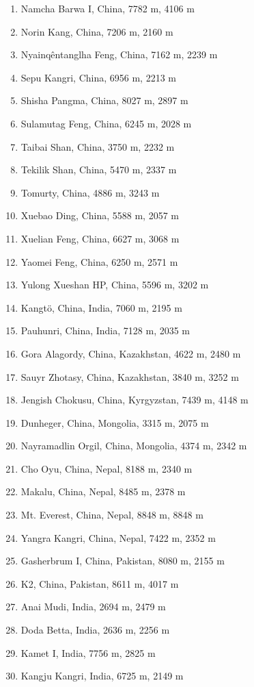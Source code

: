 \documentclass[10pt,twocolumn,letterpaper]{article}
\begin{document}
\begin{flushleft}
\begin{enumerate}
    \item Namcha Barwa I, China, 7782 m, 4106 m
    \item Norin Kang, China, 7206 m, 2160 m
    \item Nyainqêntanglha Feng, China, 7162 m, 2239 m
    \item Sepu Kangri, China, 6956 m, 2213 m
    \item Shisha Pangma, China, 8027 m, 2897 m
    \item Sulamutag Feng, China, 6245 m, 2028 m
    \item Taibai Shan, China, 3750 m, 2232 m
    \item Tekilik Shan, China, 5470 m, 2337 m
    \item Tomurty, China, 4886 m, 3243 m
    \item Xuebao Ding, China, 5588 m, 2057 m
    \item Xuelian Feng, China, 6627 m, 3068 m
    \item Yaomei Feng, China, 6250 m, 2571 m
    \item Yulong Xueshan HP, China, 5596 m, 3202 m
    \item Kangtö, China, India, 7060 m, 2195 m
    \item Pauhunri, China, India, 7128 m, 2035 m
    \item Gora Alagordy, China, Kazakhstan, 4622 m, 2480 m
    \item Sauyr Zhotasy, China, Kazakhstan, 3840 m, 3252 m
    \item Jengish Chokusu, China, Kyrgyzstan, 7439 m, 4148 m
    \item Dunheger, China, Mongolia, 3315 m, 2075 m
    \item Nayramadlin Orgil, China, Mongolia, 4374 m, 2342 m
    \item Cho Oyu, China, Nepal, 8188 m, 2340 m
    \item Makalu, China, Nepal, 8485 m, 2378 m
    \item Mt. Everest, China, Nepal, 8848 m, 8848 m
    \item Yangra Kangri, China, Nepal, 7422 m, 2352 m
    \item Gasherbrum I, China, Pakistan, 8080 m, 2155 m
    \item K2, China, Pakistan, 8611 m, 4017 m
    \item Anai Mudi, India, 2694 m, 2479 m
    \item Doda Betta, India, 2636 m, 2256 m
    \item Kamet I, India, 7756 m, 2825 m
    \item Kangju Kangri, India, 6725 m, 2149 m

\end{enumerate}
\end{flushleft}
\end{document}
